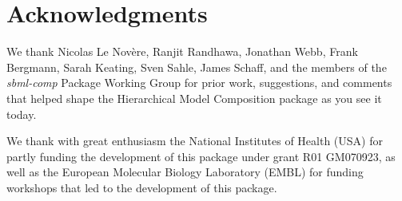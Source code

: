
\section{Acknowledgments}

We thank Nicolas Le Nov\`{e}re, Ranjit Randhawa, Jonathan Webb, Frank Bergmann, Sarah Keating, Sven Sahle, James Schaff, and the members of the \emph{sbml-comp} Package Working Group for prior work, suggestions, and comments that helped shape the Hierarchical Model Composition package as you see it today.

We thank with great enthusiasm the National Institutes of Health (USA) for partly funding the development of this package under grant R01 GM070923, as well as the European Molecular Biology Laboratory (EMBL) for funding workshops that led to the development of this package.
